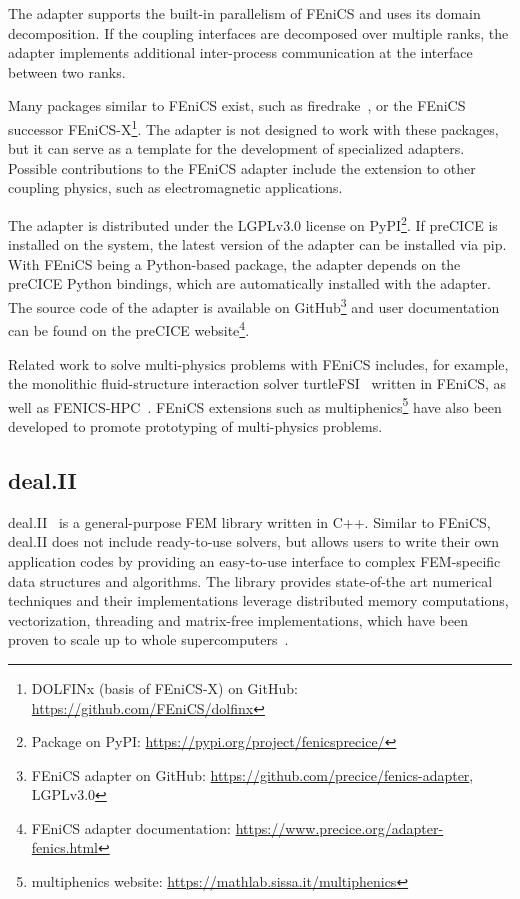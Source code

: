 The adapter supports the built-in parallelism of FEniCS and uses its domain decomposition. If the coupling interfaces are decomposed over multiple ranks, the adapter implements additional inter-process communication at the interface between two ranks.

Many packages similar to FEniCS exist, such as firedrake~\cite{Rathgeber2016}, or the FEniCS successor \mbox{FEniCS-X}\footnote{DOLFINx (basis of FEniCS-X) on GitHub: \url{https://github.com/FEniCS/dolfinx}}. The adapter is not designed to work with these packages, but it can serve as a template for the development of specialized adapters. Possible contributions to the FEniCS adapter include the extension to other coupling physics, such as electromagnetic applications.

The adapter is distributed under the LGPLv3.0 license on PyPI\footnote{Package  on PyPI: \url{https://pypi.org/project/fenicsprecice/}}. If preCICE is installed on the system, the latest version of the adapter can be installed via pip. With FEniCS being a Python-based package, the adapter depends on the preCICE Python bindings, which are automatically installed with the adapter. The source code of the adapter is available on GitHub\footnote{FEniCS adapter on GitHub: \url{https://github.com/precice/fenics-adapter}, LGPLv3.0} and user documentation can be found on the preCICE website\footnote{FEniCS adapter documentation: \url{https://www.precice.org/adapter-fenics.html}}.

Related work to solve multi-physics problems with FEniCS includes, for example, the monolithic fluid-structure interaction solver turtleFSI~\cite{Bergersen2020} written in FEniCS, as well as \mbox{FENICS-HPC}~\cite{FENICS-HPC}. FEniCS extensions such as multiphenics\footnote{multiphenics website: \url{https://mathlab.sissa.it/multiphenics}} have also been developed to promote prototyping of multi-physics problems.

\subsection{deal.II} 

deal.II~\cite{dealII92,dealii2019design} is a general-purpose FEM library written in C++. Similar to FEniCS, deal.II does not include ready-to-use solvers, but allows users to write their own application codes by providing an easy-to-use interface to complex FEM-specific data structures and algorithms. The library
provides state-of-the art numerical techniques and their implementations leverage distributed memory computations, vectorization, threading and matrix-free implementations, which have been proven to scale up to whole supercomputers~\cite{dealiiDistributed,kronbichler2018performance}.

